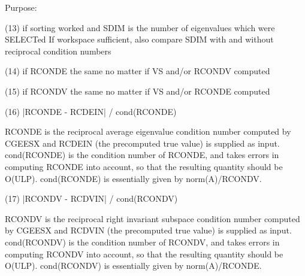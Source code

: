 \begin{DoxyParagraph}{Purpose\+: }
\begin{DoxyVerb}
    (13)    if sorting worked and SDIM is the number of
            eigenvalues which were SELECTed
            If workspace sufficient, also compare SDIM with and
            without reciprocal condition numbers

    (14)    if RCONDE the same no matter if VS and/or RCONDV computed

    (15)    if RCONDV the same no matter if VS and/or RCONDE computed

    (16)  |RCONDE - RCDEIN| / cond(RCONDE)

       RCONDE is the reciprocal average eigenvalue condition number
       computed by CGEESX and RCDEIN (the precomputed true value)
       is supplied as input.  cond(RCONDE) is the condition number
       of RCONDE, and takes errors in computing RCONDE into account,
       so that the resulting quantity should be O(ULP). cond(RCONDE)
       is essentially given by norm(A)/RCONDV.

    (17)  |RCONDV - RCDVIN| / cond(RCONDV)

       RCONDV is the reciprocal right invariant subspace condition
       number computed by CGEESX and RCDVIN (the precomputed true
       value) is supplied as input. cond(RCONDV) is the condition
       number of RCONDV, and takes errors in computing RCONDV into
       account, so that the resulting quantity should be O(ULP).
       cond(RCONDV) is essentially given by norm(A)/RCONDE.\end{DoxyVerb}
 
\end{DoxyParagraph}

